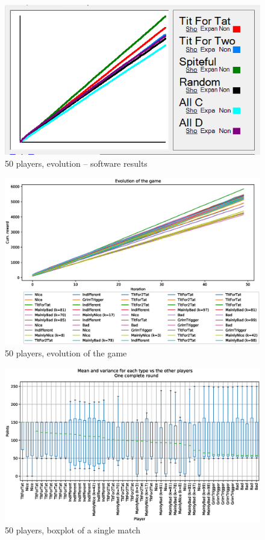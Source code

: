 \documentclass[journal,a4paper,10pt,twoside]{IEEEtran} %
\begin{document}
\begin{figure}[!ht]
    \centering
	\includegraphics[width=.9\columnwidth]{../img/ipdmp/ipdmp50-plot-det}
	\caption{50 players, evolution -- software results \cite{demosw}}
	\label{fig:boxIPDMPevo50sw}
\end{figure}

\begin{figure}[!ht]
    \centering
    \includegraphics[width=1\columnwidth]{../img/ipdmp/ipdmp-evolution-of-game-50}
    \caption{50 players, evolution of the game}
    \label{fig:boxIPDMPevo}
\end{figure}

\begin{figure}[!ht]
    \centering
    \includegraphics[width=1\columnwidth]{../img/ipdmp/ipdmp-boxplot-single-match-50}
    \caption{50 players, boxplot of a single match}
    \label{fig:boxIPDMPsingle}
\end{figure}
\end{document}
